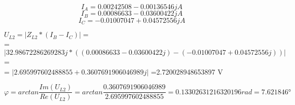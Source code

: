 \[
  I_A = 
  0.00242508 -0.00136546j A
\]
\[
  I_B = 
  0.00086633 -0.03600422j A
\]
\[
  I_C =
 -0.01007047 + 0.04572556j A
\]

  $U_{L2} = |Z_{L2} * (I_B-I_C)|=$\\
  = $|32.98672286269283j*((0.00086633-0.03600422j)-(-0.01007047+0.04572556j))|$=\\
  = $|2.695997602488855+0.3607691906046989j|$
  =2.720028948653897 V

  \[
    \varphi = arctan \displaystyle\frac{Im(U_{L2})}{Re(U_{L2})}
    = arctan \displaystyle\frac{0.3607691906046989}{2.695997602488855}
    = 0.13302631216320196rad
    = 7.621846\si\degree
  \]

